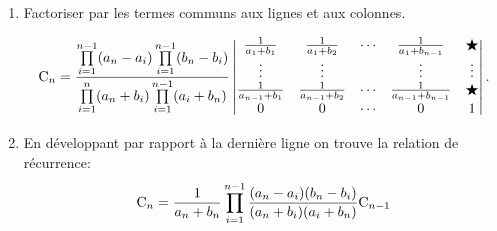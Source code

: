 \begin{itemize}
\begin{enumerate}
        \item Factoriser par les termes communs aux lignes et aux colonnes.
        
        $$\mathrm{C}_n =  \frac{\prod\limits_{i=1}^{n-1} (a_n - a_i) \prod\limits_{i = 1}^{n-1}(b_n - b_i)}{\prod\limits_{i=1}^{n}(a_n + b_i) \prod\limits_{i = 1}^{n - 1} (a_i + b_n)} \begin{vmatrix}
            \frac{1}{a_1+b_1} & \frac{1}{a_1+b_2} & \cdots & \frac{1}{a_1+b_{n-1}} & \bigstar \\
            \vdots & \vdots & & \vdots & \vdots \\
            \frac{1}{a_{n-1}+b_1} & \frac{1}{a_{n-1}+b_2} & \cdots & \frac{1}{a_{n-1}+b_{n-1}} & \bigstar \\
            0 & 0 & \cdots & 0 & 1
        \end{vmatrix}.$$
        
        \item En développant par rapport à la dernière ligne on trouve la relation de récurrence:
        $$\mathrm{C}_n =  \frac{1}{a_n + b_n} \prod\limits_{i = 1}^{n-1}\frac{(a_n - a_i)(b_n - b_i)}{(a_n + b_i)(a_i + b_n)} \mathrm{C}_{n-1}$$
    \end{enumerate}
\end{itemize}